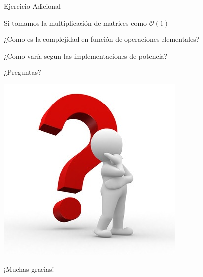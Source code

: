 \documentclass[pdf]{beamer}
\newtheorem{enun}{Enunciado}
\begin{document}
\begin{frame}{Ejercicio Adicional}
    \par{Si tomamos la multiplicación de matrices como $\mathcal{O}(1)$}
    \par{¿Como es la complejidad en función de operaciones elementales?}
    
    \pause
    \vspace{1em}
    ¿Como varía segun las implementaciones de potencia?
    
    
	
    
\end{frame}

\begin{frame}
    \huge{¿Preguntas?}
    \begin{center}
        \includegraphics[scale=0.4]{img/question-mark.jpg}
    \end{center}
    \large{¡Muchas gracias!}
\end{frame}
\end{document}

